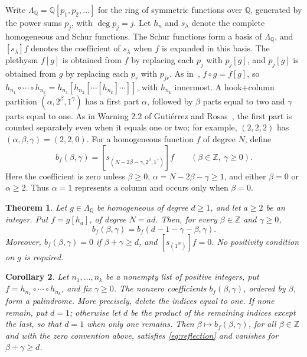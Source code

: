\documentclass[11pt]{article}
\newtheorem{theorem}{Theorem}
\newtheorem{corollary}[theorem]{Corollary}
\newcommand{\Q}{\mathbb{Q}}
\newcommand{\Z}{\mathbb{Z}}
\begin{document}
Write $\Lambda_{\Q}=\Q[p_1,p_2,\ldots]$ for the ring of symmetric functions over $\Q$, generated by the power sums $p_j$, with $\deg p_j=j$. Let $h_n$ and $s_\lambda$ denote the complete homogeneous and Schur functions. The Schur functions form a basis of $\Lambda_{\Q}$, and $[s_\lambda]f$ denotes the coefficient of $s_\lambda$ when $f$ is expanded in this basis. The plethysm $f[g]$ is obtained from $f$ by replacing each $p_j$ with $p_j[g]$, and $p_j[g]$ is obtained from $g$ by replacing each $p_r$ with $p_{jr}$. As in~\cite[Definition 2.5]{GR}, $f\circ g=f[g]$, so $h_{n_1}\circ\cdots\circ h_{n_k}=h_{n_1}[h_{n_2}[\cdots[h_{n_k}]\cdots]]$, with $h_{n_k}$ innermost. A hook+column partition $(\alpha,2^\beta,1^\gamma)$ has a first part $\alpha$, followed by $\beta$ parts equal to two and $\gamma$ parts equal to one. As in Warning 2.2 of Gutiérrez and Rosas~\cite{GR}, the first part is counted separately even when it equals one or two; for example, $(2,2,2)$ has $(\alpha,\beta,\gamma)=(2,2,0)$. For a homogeneous function $f$ of degree $N$, define
\[
 b_f(\beta,\gamma)=[s_{(N-2\beta-\gamma,2^\beta,1^\gamma)}]f
 \qquad(\beta\in\Z,\ \gamma\geq0).
\]
Here the coefficient is zero unless $\beta\geq0$, $\alpha=N-2\beta-\gamma\geq1$, and either $\beta=0$ or $\alpha\geq2$. Thus $\alpha=1$ represents a column and occurs only when $\beta=0$.

\begin{theorem}\label{thm:main}
Let $g\in\Lambda_{\Q}$ be homogeneous of degree $d\geq1$, and let $a\geq2$ be an integer. Put $f=g[h_a]$, of degree $N=ad$. Then, for every $\beta\in\Z$ and $\gamma\geq0$,
\begin{equation}\label{eq:reflection}
 b_f(\beta,\gamma)=b_f(d-1-\gamma-\beta,\gamma).
\end{equation}
Moreover, $b_f(\beta,\gamma)=0$ if $\beta+\gamma\geq d$, and $[s_{(1^N)}]f=0$. No positivity condition on $g$ is required.
\end{theorem}

\begin{corollary}\label{cor:question}
Let $n_1,\ldots,n_k$ be a nonempty list of positive integers, put $f=h_{n_1}\circ\cdots\circ h_{n_k}$, and fix $\gamma\geq0$. The nonzero coefficients $b_f(\beta,\gamma)$, ordered by $\beta$, form a palindrome. More precisely, delete the indices equal to one. If none remain, put $d=1$; otherwise let $d$ be the product of the remaining indices except the last, so that $d=1$ when only one remains. Then $\beta\mapsto b_f(\beta,\gamma)$, for all $\beta\in\Z$ and with the zero convention above, satisfies \eqref{eq:reflection} and vanishes for $\beta+\gamma\geq d$.
\end{corollary}
\end{document}
